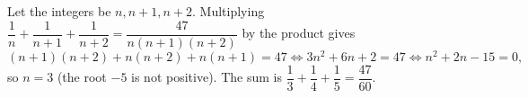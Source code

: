 Let the integers be $n,n+1,n+2$. Multiplying $\dfrac{1}{n}+\dfrac{1}{n+1}+\dfrac{1}{n+2}=\dfrac{47}{n(n+1)(n+2)}$ by the product gives
\[
(n+1)(n+2)+n(n+2)+n(n+1)=47\iff3n^2+6n+2=47\iff n^2+2n-15=0,
\]
so $n=3$ (the root $-5$ is not positive). The sum is $\dfrac{1}{3}+\dfrac{1}{4}+\dfrac{1}{5}=\boxed{\dfrac{47}{60}}$.
